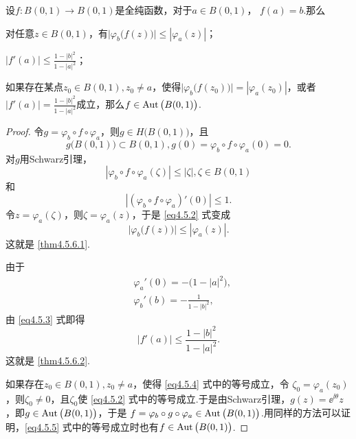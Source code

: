 \begin{theorem}\label{thm4.5.6}
设$f:B(0,1)\to B(0,1)$是全纯函数，对于$a\in B(0,1)$，  $f(a)=b$.那么
\begin{eenum}
  \item \label{thm4.5.6.1} 对任意$z\in B(0,1)$，有$\big|\varphi_b\big(f(z)\big)\big|
  \le|\varphi_a(z)|$；
  \item \label{thm4.5.6.2} $|f'(a)|\le\frac{1-|b|^2}{1-|a|^2}$；
  \item \label{thm4.5.6.3} 如果存在某点$z_0\in B(0,1),z_0\ne a$，使得$\big|\varphi_b\big(f(z_0)\big)\big|
  =|\varphi_a(z_0)|$，或者$|f'(a)|=\frac{1-|b|^2}{1-|a|^2}$成立，那么$f\in\operatorname{Aut}\big(B(0,1)\big)$.
\end{eenum}
\end{theorem}
\begin{proof}
令$g=\varphi_b\circ f\circ \varphi_a$，则$g\in H\big(B(0,1)\big)$，且
\[g\big(B(0,1)\big)
\subset B(0,1),g(0)=\varphi_b\circ f\circ \varphi_a(0)=0.\]
对$g$用Schwarz引理，
\begin{equation}\label{eq4.5.2}
|\varphi_b\circ f\circ\varphi_a(\zeta)|\le|\zeta|,\zeta\in B(0,1)
\end{equation}
和
\begin{equation}\label{eq4.5.3}
|(\varphi_b\circ f\circ\varphi_a)'(0)|\le1.
\end{equation}
令$z=\varphi_a(\zeta)$，则$\zeta=\varphi_a(z)$，于是 \eqref{eq4.5.2} 式变成
\begin{equation}\label{eq4.5.4}
\big|\varphi_b\big(f(z)\big)\big|\le|\varphi_a(z)|.
\end{equation}
这就是 \ref{thm4.5.6.1}.

由于
\begin{align*}
&\varphi_a'(0)=-\big(1-|a|^2\big),\\
&\varphi_b'(b)=-\frac1{1-|b|^2},
\end{align*}
由 \eqref{eq4.5.3} 式即得
\begin{equation}\label{eq4.5.5}
|f'(a)|\le\frac{1-|b|^2}{1-|a|^2}.
\end{equation}
这就是 \ref{thm4.5.6.2}.

如果存在$z_0\in B(0,1),z_0\ne a$，使得 \eqref{eq4.5.4} 式中的等号成立，令
$\zeta_0=\varphi_a(z_0)$，则$\zeta_0\ne0$，且$\zeta_0$使 \eqref{eq4.5.2} 式中的等号成立.于是由Schwarz引理，$g(z)=\ee^{\ii\theta}z$，即$g\in \operatorname{Aut}\big(B(0,1)\big)$，于是
$f=\varphi_b\circ g\circ\varphi_a\in \operatorname{Aut}\big(B(0,1)\big)$.用同样的方法可以证明，\eqref{eq4.5.5} 式中的等号成立时也有$f\in\operatorname{Aut}\big(B(0,1)\big)$.
\end{proof}

